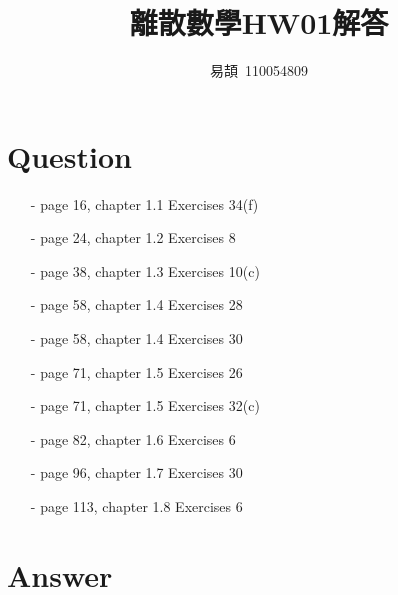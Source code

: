 \documentclass[sigconf]{acmart}
\begin{document}
\title{離散數學HW01解答}

\author{易頡~110054809}
\orcid{}

\maketitle

\section{Question}
\begin{itemize}
    \item[-] page 16, chapter 1.1 Exercises 34(f)
	\item[-] page 24, chapter 1.2 Exercises 8
	\item[-] page 38, chapter 1.3 Exercises 10(c)
	\item[-] page 58, chapter 1.4 Exercises 28
	\item[-] page 58, chapter 1.4 Exercises 30
	\item[-] page 71, chapter 1.5 Exercises 26
	\item[-] page 71, chapter 1.5 Exercises 32(c)
	\item[-] page 82, chapter 1.6 Exercises 6
	\item[-] page 96, chapter 1.7 Exercises 30
	\item[-] page 113, chapter 1.8 Exercises 6
\end{itemize}

\section{Answer}
\end{document}
